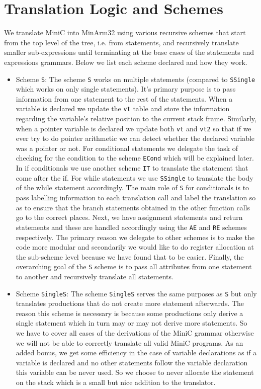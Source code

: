 \documentclass{article}
\begin{document}
\section{Translation Logic and Schemes}
We translate MiniC into MinArm32 using various recursive schemes that start from the top level of the tree, i.e. from statements, and recursively translate smaller sub-expressions until terminating at the base cases of the statements and expressions grammars. Below we list each scheme declared and how they work.
\begin{itemize}
  \item Scheme \texttt{S}: The scheme \texttt{S} works on multiple statements (compared to \texttt{SSingle} which works on only single statements). It's primary purpose is to pass information from one statement to the rest of the statements. When a variable is declared we update the \texttt{vt} table and store the information regarding the variable's relative position to the current stack frame. Similarly, when a pointer variable is declared we update both \texttt{vt} and \texttt{vt2} so that if we ever try to do pointer arithmetic we can detect whether the declared variable was a pointer or not. For conditional statements we delegate the task of checking for the condition to the scheme \texttt{ECond} which will be explained later. In if conditionals we use another scheme \texttt{IT} to translate the statement that come after the if. For while statements we use \texttt{SSingle} to translate the body of the while statement accordingly. The main role of \texttt{S} for conditionals is to pass labelling information to each translation call and label the translation so as to ensure that the branch statements obtained in the other function calls go to the correct places. Next, we have assignment statements and return statements and these are handled accordingly using the \texttt{AE} and \texttt{RE} schemes respectively. The primary reason we delegate to other schemes is to make the code more modular and secondarily we would like to do register allocation at the sub-scheme level because we have found that to be easier. Finally, the overarching goal of the \texttt{S} scheme is to pass all attributes from one statement to another and recursively translate all statements.
  \item Scheme \texttt{SingleS}: The scheme \texttt{SingleS} serves the same purposes as \texttt{S} but only translates productions that do not create more statement afterwards. The reason this scheme is necessary is because some productions only derive a single statement which in turn may or may not derive more statements. So we have to cover all cases of the derivations of the MiniC grammar otherwise we will not be able to correctly translate all valid MiniC programs. As an added bonus, we get some efficiency in the case of variable declarations as if a variable is declared and no other statements follow the variable declaration this variable can be never used. So we choose to never allocate the statement on the stack which is a small but nice addition to the translator.

\end{itemize}
\end{document}
